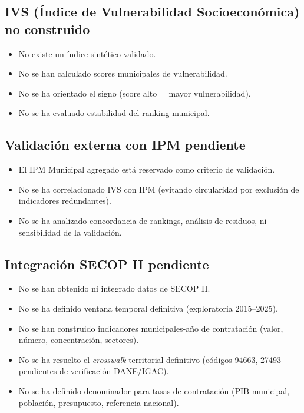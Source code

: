 \subsection{IVS (Índice de Vulnerabilidad Socioeconómica) no construido}
\label{sec:ivs_pendiente}

\begin{itemize}
    \item No existe un índice sintético validado.
    \item No se han calculado scores municipales de vulnerabilidad.
    \item No se ha orientado el signo (score alto = mayor vulnerabilidad).
    \item No se ha evaluado estabilidad del ranking municipal.
\end{itemize}

\subsection{Validación externa con IPM pendiente}
\label{sec:validacion_ipm_pendiente}

\begin{itemize}
    \item El IPM Municipal agregado está reservado como criterio de validación.
    \item No se ha correlacionado IVS con IPM (evitando circularidad por exclusión de indicadores redundantes).
    \item No se ha analizado concordancia de rankings, análisis de residuos, ni sensibilidad de la validación.
\end{itemize}

\subsection{Integración SECOP II pendiente}
\label{sec:secop_pendiente}

\begin{itemize}
    \item No se han obtenido ni integrado datos de SECOP II.
    \item No se ha definido ventana temporal definitiva (exploratoria 2015--2025).
    \item No se han construido indicadores municipales-año de contratación (valor, número, concentración, sectores).
    \item No se ha resuelto el \textit{crosswalk} territorial definitivo (códigos 94663, 27493 pendientes de verificación DANE/IGAC).
    \item No se ha definido denominador para tasas de contratación (PIB municipal, población, presupuesto, referencia nacional).
\end{itemize}

